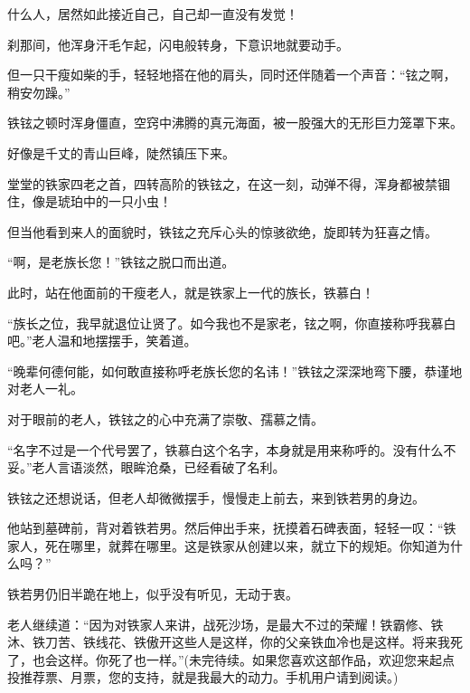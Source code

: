 \begin{this_body}
什么人，居然如此接近自己，自己却一直没有发觉！

刹那间，他浑身汗毛乍起，闪电般转身，下意识地就要动手。

但一只干瘦如柴的手，轻轻地搭在他的肩头，同时还伴随着一个声音：“铉之啊，稍安勿躁。”

铁铉之顿时浑身僵直，空窍中沸腾的真元海面，被一股强大的无形巨力笼罩下来。

好像是千丈的青山巨峰，陡然镇压下来。

堂堂的铁家四老之首，四转高阶的铁铉之，在这一刻，动弹不得，浑身都被禁锢住，像是琥珀中的一只小虫！

但当他看到来人的面貌时，铁铉之充斥心头的惊骇欲绝，旋即转为狂喜之情。

“啊，是老族长您！”铁铉之脱口而出道。

此时，站在他面前的干瘦老人，就是铁家上一代的族长，铁慕白！

“族长之位，我早就退位让贤了。如今我也不是家老，铉之啊，你直接称呼我慕白吧。”老人温和地摆摆手，笑着道。

“晚辈何德何能，如何敢直接称呼老族长您的名讳！”铁铉之深深地弯下腰，恭谨地对老人一礼。

对于眼前的老人，铁铉之的心中充满了崇敬、孺慕之情。

“名字不过是一个代号罢了，铁慕白这个名字，本身就是用来称呼的。没有什么不妥。”老人言语淡然，眼眸沧桑，已经看破了名利。

铁铉之还想说话，但老人却微微摆手，慢慢走上前去，来到铁若男的身边。

他站到墓碑前，背对着铁若男。然后伸出手来，抚摸着石碑表面，轻轻一叹：“铁家人，死在哪里，就葬在哪里。这是铁家从创建以来，就立下的规矩。你知道为什么吗？”

铁若男仍旧半跪在地上，似乎没有听见，无动于衷。

老人继续道：“因为对铁家人来讲，战死沙场，是最大不过的荣耀！铁霸修、铁沐、铁刀苦、铁线花、铁傲开这些人是这样，你的父亲铁血冷也是这样。将来我死了，也会这样。你死了也一样。”(未完待续。如果您喜欢这部作品，欢迎您来起点投推荐票、月票，您的支持，就是我最大的动力。手机用户请到阅读。)

\end{this_body}

